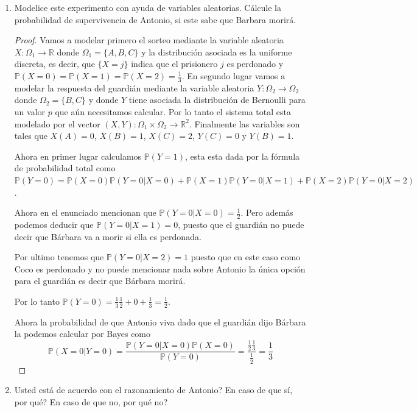 \documentclass[paper=letter, fontsize=11pt]{scrartcl} %
\numberwithin{equation}{section} %
\numberwithin{figure}{section} %
\numberwithin{table}{section} %
\newcommand{\prob}[1]{\mathbb{P}(#1)}
\begin{document}
\begin{enumerate}[label=\arabic*)]
\item Modelice este experimento con ayuda de variables aleatorias. Cálcule la probabilidad de supervivencia de Antonio, si este sabe que Barbara morirá.

\begin{proof}
Vamos a modelar primero el sorteo mediante la variable aleatoria $ X: \Omega_1 \to \mathbb{R} $ donde $ \Omega_1 = \{A,B,C\} $ y la distribución asociada es la uniforme discreta, es decir, que $ \{X=j\} $ indica que el prisionero $ j $ es perdonado y $ \prob{X=0}=\prob{X=1}=\prob{X=2}= \frac{1}{3} $. En segundo lugar vamos a modelar la respuesta del guardián mediante la variable aleatoria $ Y: \Omega_2 \to \Omega_2 $ donde $ \Omega_2 = \{B,C\} $ y donde $ Y $ tiene asociada la distribución de Bernoulli para un valor $ p $ que aún necesitamos calcular. Por lo tanto el sistema total esta modelado por el vector $ (X,Y): \Omega_1 \times \Omega_2 \to \mathbb{R}^2 $. Finalmente las variables son tales que $ X(A)=0 $, $ X(B)=1 $, $ X(C)=2 $, $ Y(C)=0 $ y $ Y(B)=1 $.

Ahora en primer lugar calculamos $ \prob{Y=1} $, esta esta dada por la fórmula de probabilidad total como $ \prob{Y = 0}= \prob{X=0}\prob{Y=0|X=0}+\prob{X=1}\prob{Y=0|X=1}
+\prob{X=2}\prob{Y=0|X=2} $.

Ahora en el enunciado mencionan que $ \prob{Y=0|X=0} = \frac{1}{2} $. Pero además podemos deducir que $ \prob{Y=0|X=1} = 0 $, puesto que el guardián no puede decir que Bárbara va a morir si ella es perdonada.

Por ultimo tenemos que $ \prob{Y=0|X=2}=1 $ puesto que en este caso como Coco es perdonado y no puede mencionar nada sobre Antonio la única opción para el guardián es decir que Bárbara morirá.

Por lo tanto $ \prob{Y = 0} = \frac{1}{3}\frac{1}{2}+0+\frac{1}{3}= \frac{1}{2} $.

Ahora la probabilidad de que Antonio viva dado que el guardián dijo Bárbara la podemos calcular por Bayes como
\begin{equation}
\prob{X=0|Y=0} = \frac{\prob{Y=0|X=0}\prob{X=0}}{\prob{Y=0}}= \frac{\frac{1}{2}\frac{1}{3}}{\frac{1}{2}}= \frac{1}{3} \nonumber
\end{equation}
\end{proof}

\item Usted está de acuerdo con el razonamiento de Antonio? En caso de que sí, por qué? En caso de que no, por qué no?


\end{enumerate}
\end{document}
